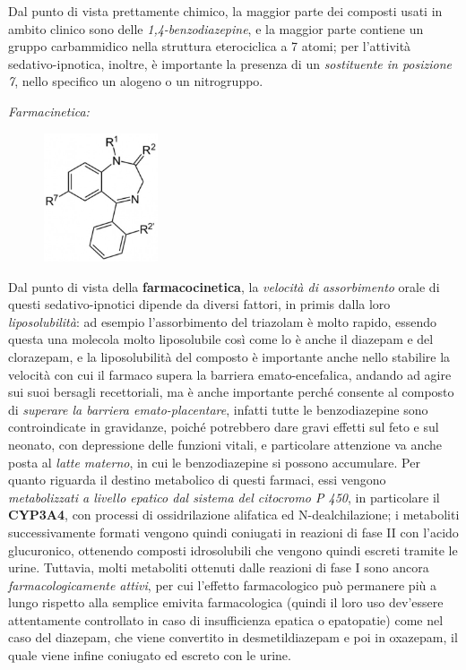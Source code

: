 \begin{itemize}
Dal punto di vista prettamente chimico, la maggior parte dei composti
usati in ambito clinico sono delle \emph{1,4-benzodiazepine}, e la
maggior parte contiene un gruppo carbammidico nella struttura
eterociclica a 7 atomi; per l'attività sedativo-ipnotica, inoltre, è
importante la presenza di un \emph{sostituente in posizione 7}, nello
specifico un alogeno o un nitrogruppo.

\emph{\emph{Farmacinetica:}}

\begin{figure}[!ht]
\centering
	\includegraphics[width=0.3\textwidth]{04/image1.jpeg}
\end{figure}

Dal
punto di vista della \textbf{farmacocinetica}, la \emph{velocità di
assorbimento} orale di questi sedativo-ipnotici dipende da diversi
fattori, in primis dalla loro \emph{liposolubilità}: ad esempio
l'assorbimento del triazolam è molto rapido, essendo questa una molecola
molto liposolubile così come lo è anche il diazepam e del clorazepam, e
la liposolubilità del composto è importante anche nello stabilire la
velocità con cui il farmaco supera la barriera emato-encefalica, andando
ad agire sui suoi bersagli recettoriali, ma è anche importante perché
consente al composto di \emph{superare la barriera emato-placentare},
infatti tutte le benzodiazepine sono controindicate in gravidanze,
poiché potrebbero dare gravi effetti sul feto e sul neonato, con
depressione delle funzioni vitali, e particolare attenzione va anche
posta al \emph{latte materno}, in cui le benzodiazepine si possono
accumulare. Per quanto riguarda il destino metabolico di questi farmaci,
essi vengono \emph{metabolizzati a livello epatico dal sistema del
citocromo P 450}, in particolare il \textbf{CYP3A4}, con processi di
ossidrilazione alifatica ed N-dealchilazione; i metaboliti
successivamente formati vengono quindi coniugati in reazioni di fase II
con l'acido glucuronico, ottenendo composti idrosolubili che vengono
quindi escreti tramite le urine. Tuttavia, molti metaboliti ottenuti
dalle reazioni di fase I sono ancora \emph{farmacologicamente attivi},
per cui l'effetto farmacologico può permanere più a lungo rispetto alla
semplice emivita farmacologica (quindi il loro uso dev'essere
attentamente controllato in caso di insufficienza epatica o epatopatie)
come nel caso del diazepam, che viene convertito in desmetildiazepam e
poi in oxazepam, il quale viene infine coniugato ed escreto con le
urine.


\end{itemize}
